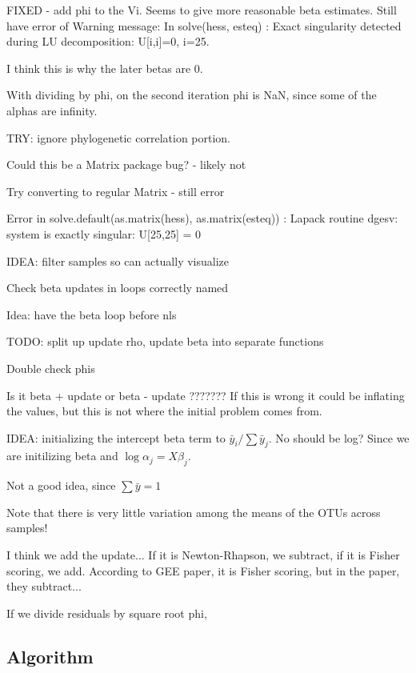 \documentclass[10pt]{article}
\begin{document}
FIXED - add phi to the Vi. Seems to give more reasonable beta estimates. Still have error of Warning message:
In solve(hess, esteq) :
  Exact singularity detected during LU decomposition: U[i,i]=0, i=25.

I think this is why the later betas are 0.


With dividing by phi, on the second iteration phi is NaN, since some of the alphas are infinity.




TRY: ignore phylogenetic correlation portion.


Could this be a Matrix package bug? - likely not

Try converting to regular Matrix - still error

Error in solve.default(as.matrix(hess), as.matrix(esteq)) :
  Lapack routine dgesv: system is exactly singular: U[25,25] = 0

IDEA: filter samples so can actually visualize


Check beta updates in loops correctly named

Idea: have the beta loop before nls

TODO: split up update rho, update beta into separate functions

Double check phis

Is it beta + update or beta - update ???????
If this is wrong it could be inflating the values, but this is not where the initial problem comes from.



IDEA: initializing the intercept beta term to $\bar y_i/\sum \bar y_j$. No should be log? Since we are initilizing beta and $\log \alpha_j = X \beta_j$.

Not a good idea, since $\sum \bar y = 1$

Note that there is very little variation among the means of the OTUs across samples!

I think we add the update...
If it is Newton-Rhapson, we subtract, if it is Fisher scoring, we add.
According to GEE paper, it is Fisher scoring, but in the paper, they subtract...


If we divide residuals by square root phi,

\subsection*{Algorithm}
\end{document}
